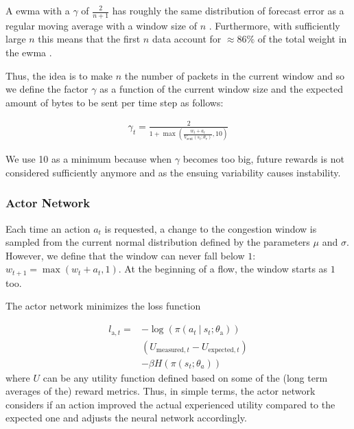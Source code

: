 \documentclass[sigconf]{acmart}
\newcommand\givenbase[1][]{\:#1\lvert\:}
\let\given\givenbase
\begin{document}
A ewma with a $\gamma$ of $\frac{2}{n+1}$ has roughly the same distribution of forecast error as a regular moving average with a window size of $n$ \cite{nahmias_production_2009}. Furthermore, with sufficiently large $n$ this means that the first $n$ data account for $\approx 86\%$ of the total weight in the ewma \cite{boissard_applications_2012}.

Thus, the idea is to make $n$ the number of packets in the current window and so we define the factor $\gamma$ as a function of the current window size and the expected amount of bytes to be sent per time step as follows:

\begin{align*}
\gamma_t = \frac{2}{1+\max(\frac{w_t+a_t}{V_\text{sent}(s_t; \theta_\text{v})},10)}
\end{align*}

We use 10 as a minimum because when $\gamma$ becomes too big, future rewards is not considered sufficiently anymore and as the ensuing variability causes instability. 

\subsubsection{Actor Network}
\label{subsubsec:actor}

Each time an action $a_t$ is requested, a change to the congestion window is sampled from the current normal distribution defined by the parameters $\mu$ and $\sigma$. However, we define that the window can never fall below $1$: $w_{t+1} = \max(w_t + a_t, 1)$. At the beginning of a flow, the window starts as $1$ too.  

The actor network minimizes the loss function

\begin{align*}
l_{\text{a},t} =& -\log \left( \pi \left( a_t \given s_t ; \theta_\text{a} \right) \right)\\
& \left( U_{\text{measured},t} - U_{\text{expected},t} \right)\\ 
&- \beta H\left( \pi\left( s_t; \theta_a \right)\right)
\end{align*}
where $U$ can be any utility function defined based on some of the (long term averages of the) reward metrics. Thus, in simple terms, the actor network considers if an action improved the actual experienced utility compared to the expected one and adjusts the neural network accordingly.
 
\end{document}
